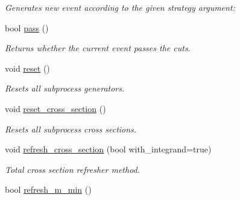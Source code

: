 \begin{DoxyCompactItemize}
\begin{DoxyCompactList}\small\item\em Generates new event according to the given strategy argument\-: \end{DoxyCompactList}\item 
\hypertarget{a00210_a0d3e8d948540d57655b7d310cb70d8ba}{bool \hyperlink{a00210_a0d3e8d948540d57655b7d310cb70d8ba}{pass} ()}\label{a00210_a0d3e8d948540d57655b7d310cb70d8ba}

\begin{DoxyCompactList}\small\item\em Returns whether the current event passes the cuts. \end{DoxyCompactList}\item 
\hypertarget{a00210_a513578e30af093a93581b3cd3667786f}{void \hyperlink{a00210_a513578e30af093a93581b3cd3667786f}{reset} ()}\label{a00210_a513578e30af093a93581b3cd3667786f}

\begin{DoxyCompactList}\small\item\em Resets all subprocess generators. \end{DoxyCompactList}\item 
\hypertarget{a00210_ac012b825829f4a734f7667bb8c6b0bb8}{void \hyperlink{a00210_ac012b825829f4a734f7667bb8c6b0bb8}{reset\-\_\-cross\-\_\-section} ()}\label{a00210_ac012b825829f4a734f7667bb8c6b0bb8}

\begin{DoxyCompactList}\small\item\em Resets all subprocess cross sections. \end{DoxyCompactList}\item 
\hypertarget{a00210_ac48b7d17637cfbaa3fde4379415621b0}{void \hyperlink{a00210_ac48b7d17637cfbaa3fde4379415621b0}{refresh\-\_\-cross\-\_\-section} (bool with\-\_\-integrand=true)}\label{a00210_ac48b7d17637cfbaa3fde4379415621b0}

\begin{DoxyCompactList}\small\item\em Total cross section refresher method. \end{DoxyCompactList}\item 
\hypertarget{a00210_a786206c05113819b08b67459225152af}{bool \hyperlink{a00210_a786206c05113819b08b67459225152af}{refresh\-\_\-m\-\_\-min} ()}\label{a00210_a786206c05113819b08b67459225152af}


\end{DoxyCompactItemize}
